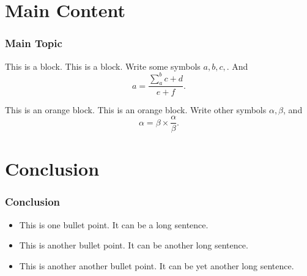 \documentclass[aspectratio=169]{beamer}
\begin{document}
\section{Main Content}
\begin{frame}
    \frametitle{Main Topic}
    \begin{block}{This is a block.}
        This is a block. Write some symbols $a,b,c,$. And
        \begin{equation}
            a=\dfrac{\sum_{a}^{b}c+d}{e+f}.
        \end{equation}
    \end{block}
    \begin{exampleblock}{This is an orange block.}
        This is an orange block. Write other symbols $\alpha, \beta$, and
        \begin{equation}
            \alpha=\beta\times\dfrac{\alpha}{\beta}.
        \end{equation}
    \end{exampleblock}
\end{frame}

\section{Conclusion}
\begin{frame}
    \frametitle{Conclusion}
    \begin{itemize}
        \item This is one bullet point. It can be a long sentence.
        \item This is another bullet point. It can be another long sentence.
        \item This is another another bullet point. It can be yet another long sentence.
    \end{itemize}
\end{frame}
\end{document}
